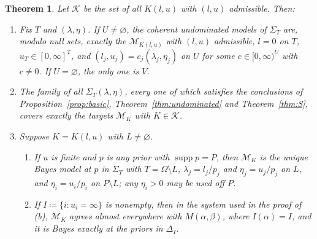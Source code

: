 \documentclass[11pt]{article}
\newtheorem{theorem}{Theorem}
\theoremstyle{remark}\newtheorem{remark}[theorem]{Remark}
\newcommand{\M}{\mathcal M}
\newcommand{\K}{\mathcal K}
\newcommand{\supp}{\operatorname{supp}}
\begin{document}
\begin{theorem}\label{thm:coverage}
Let $\K$ be the set of all $K(l,u)$ with $(l,u)$ admissible. Then:
\begin{enumerate}[label=(\alph*),leftmargin=*]
\item Fix $T$ and $(\lambda,\eta)$. If $U\ne\varnothing$, the coherent
undominated models of $\Sigma_T$ are, modulo null sets, exactly the
$\M_{K(l,u)}$ with $(l,u)$ admissible, $l=0$ on $T$, $u_T\in[0,\infty]^T$,
and $(l_j,u_j)=c_j(\lambda_j,\eta_j)$ on $U$ for some $c\in[0,\infty)^U$
with $c\ne0$. If $U=\varnothing$, the only one is $V$.
\item The family of all $\Sigma_T(\lambda,\eta)$, every one of which
satisfies the conclusions of Proposition~\ref{prop:basic},
Theorem~\ref{thm:undominated} and Theorem~\ref{thm:S}, covers exactly
the targets $\M_K$ with $K\in\K$.
\item Suppose $K=K(l,u)$ with $L\ne\varnothing$.
\begin{enumerate}[label=(c\arabic*),leftmargin=*]
\item If $u$ is finite and $p$ is any prior with $\supp p=P$, then $\M_K$
is the unique Bayes model at $p$ in $\Sigma_T$ with $T=\Omega\setminus L$,
$\lambda_j=l_j/p_j$ and $\eta_j=u_j/p_j$ on $L$, and $\eta_i=u_i/p_i$ on
$P\setminus L$; any $\eta_i>0$ may be used off $P$.
\item If $I\coloneqq\{i:u_i=\infty\}$ is nonempty, then in the system used
in the proof of (b), $\M_K$ agrees almost everywhere with $M(\alpha,\beta)$,
where $I(\alpha)=I$, and it is Bayes exactly at the priors in $\Delta_I$.
\end{enumerate}
\end{enumerate}
\end{theorem}
\end{document}
